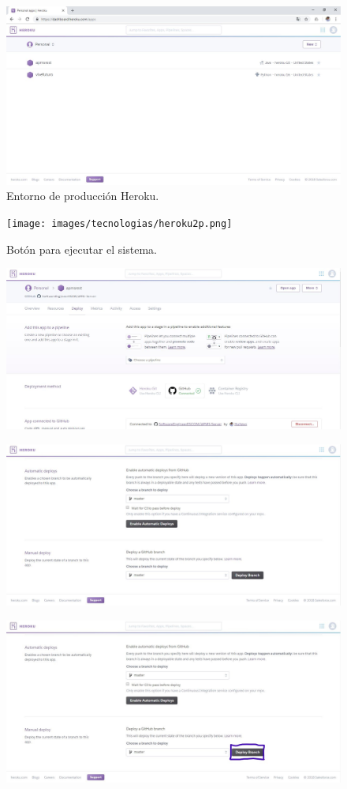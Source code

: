 \begin{figure}[!h]
	\centering
	\includegraphics[width=0.7\linewidth]{images/tecnologias/heroku.JPG}
	\caption{Entorno de producción Heroku.}
\end{figure}


\begin{figure}[!h]
	\centering
	\texttt{[image: images/tecnologias/heroku2p.png]}
	\caption{Botón para ejecutar el sistema.}
\end{figure}


\begin{figure}[!h]
	\centering
	\includegraphics[width=0.7\linewidth]{images/tecnologias/heroku3.JPG}
\end{figure}


\begin{figure}[!h]
	\centering
	\includegraphics[width=0.7\linewidth]{images/tecnologias/heroku4.JPG}
\end{figure}

\begin{figure}[!h]
	\centering
	\includegraphics[width=0.7\linewidth]{images/tecnologias/heroku4p.JPG}
\end{figure}

